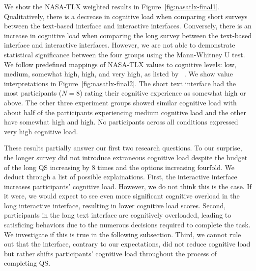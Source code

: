 We show the NASA-TLX weighted results in Figure~\ref{fig:nasatlx-final1}. Qualitatively, there is a decrease in cognitive load when comparing short surveys between the text-based interface and interactive interfaces. Conversely, there is an increase in cognitive load when comparing the long survey between the text-based interface and interactive interfaces. However, we are not able to demonstrate statistical significance between the four groups using the Mann-Whitney U test. We follow predefined mappings of NASA-TLX values to cognitive levels: low, medium, somewhat high, high, and very high, as listed by ~\textcite{hart1988development}. We show value interpretations in Figure~\ref{fig:nasatlx-final2}. The short text interface had the most participants ($N=8$) rating their cognitive experience as somewhat high or above. The other three experiment groups showed similar cognitive load with about half of the participants experiencing medium cognitive laod and the other have somewhat high and high. No participants across all conditions expressed very high cognitive load.

These results partially answer our first two research questions. To our surprise, the longer survey did not introduce extraneous cognitive load despite the budget of the long QS increasing by 8 times and the options increasing fourfold. We deduct through a list of possible explainations. First, the interactive interface increases participants' cognitive load. However, we do not think this is the case. If it were, we would expect to see even more significant cognitive overload in the long interactive interface, resulting in lower cognitive load scores. Second, participants in the long text interface are cognitively overloaded, leading to satisficing behaviors due to the numerous decisions required to complete the task. We investigate if this is true in the following subsection. Third, we cannot rule out that the interface, contrary to our expectations, did not reduce cognitive load but rather shifts participants' cognitive load throughout the process of completing QS.


